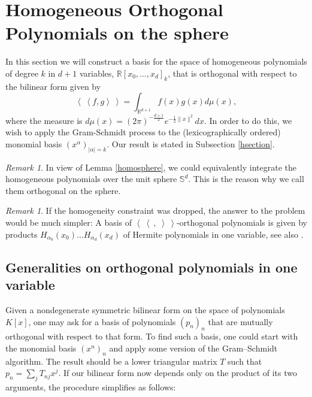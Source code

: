 \documentclass{amsart}
\newcommand{\bra}{\left<\!\!\!\:\left<}
\newcommand{\ket}{\right>\!\!\!\:\right>}
\newcommand{\R}{\mathbb{R}}
\renewcommand{\S}{\mathbb{S}}
\theoremstyle{plain}
\theoremstyle{definition}
\theoremstyle{remark}
\newtheorem{remark}[theorem]{Remark}
\begin{document}
\section{Homogeneous Orthogonal Polynomials on the sphere}
In this section we will construct a basis for the space of homogeneous polynomials of degree $k$ in $d+1$ variables, $\R[x_0,\ldots,x_d]_k$, that is orthogonal with respect to the bilinear form given by
\begin{equation*}
 \bra f,g\ket = \int_{\R^{d+1}}f(x)g(x) d\mu(x),
\end{equation*}
where the measure is $d\mu(x) = (2\pi)^{-\frac{d+1}{2}}e^{-\frac{1}{2}\|x\|^2}dx$. In order to do this, we wish to apply the Gram-Schmidt process to the (lexicographically ordered) monomial basis $(x^\alpha)_{|\alpha |=k}$. Our result is stated in Subsection \ref{hsection}. 
\begin{remark}
In view of Lemma \ref{homosphere}, we could equivalently integrate the homogeneous polynomials over the unit sphere $\S^d$. This is the reason why we call them orthogonal on the sphere.
\end{remark}
\begin{remark}
 If the homogeneity constraint was dropped, the answer to the problem would be much simpler: A basis of $ \bra\ ,\;\ket$-orthogonal polynomials is given by products $H_{\alpha_0}\!(x_0)\ldots H_{\alpha_d}\!(x_d)$ of Hermite polynomials in one variable, see also \cite[Sect.~2.3.4]{Dunkl}.
\end{remark}



\subsection{Generalities on orthogonal polynomials in one variable}
Given a nondegenerate symmetric bilinear form on the space of polynomials $K[x]$, one may ask for a basis of polynomials $(p_n)_n$ that are mutually orthogonal with respect to that form. To find such a basis, one could start with the monomial basis $(x^n)_n$ and apply some version of the Gram--Schmidt algorithm. The result should be a lower triangular matrix $T$ such that $p_n =\sum_j T_{nj} x^j$. If our bilinear form now depends only on the product of its two arguments, the procedure simplifies as follows:
\end{document}
